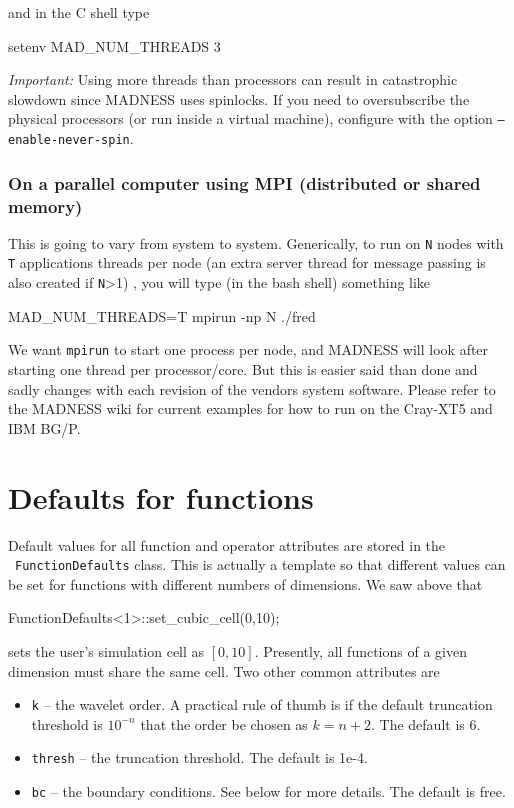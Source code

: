 \documentclass[letterpaper]{article}
\newcommand\liststyleLiv{%
\renewcommand\labelitemi{{\textbullet}}
\renewcommand\labelitemii{${\circ}$}
\renewcommand\labelitemiii{${\blacksquare}$}
\renewcommand\labelitemiv{{\textbullet}}
}
\begin{document}
and in the C shell type

{\ttfamily
setenv MAD\_NUM\_THREADS 3}


\bigskip

\textit{Important: }Using more threads than processors can result in catastrophic slowdown since MADNESS uses spinlocks.
If you need to oversubscribe the physical processors (or run inside a virtual machine), configure with the option
\texttt{{}--enable-never-spin}.

\subsubsection{On a parallel computer using MPI (distributed or shared memory)}
This is going to vary from system to system. Generically, to run on \texttt{N} nodes with \texttt{T} applications
threads per node (an extra server thread for message passing is also created if \texttt{N}{\textgreater}1) , you will
type (in the bash shell) something like

{\ttfamily
MAD\_NUM\_THREADS=T mpirun -np N ./fred}


\bigskip

We want \texttt{mpirun} to start one process per node, and MADNESS will look after starting one thread per
processor/core. But this is easier said than done and sadly changes with each revision of the vendors system software.
Please refer to the MADNESS wiki for current examples for how to run on the Cray-XT5 and IBM BG/P.

\section{Defaults for functions}
Default values for all function and operator attributes are stored in the \ \texttt{FunctionDefaults} class. This is
actually a template so that different values can be set for functions with different numbers of dimensions. We saw
above that

{\ttfamily
FunctionDefaults{\textless}1{\textgreater}::set\_cubic\_cell(0,10);}

sets the user's simulation cell as  $[0,10]$. Presently, all functions of a given dimension must share the same cell.
Two other common attributes are

\liststyleLiv
\begin{itemize}
\item \texttt{k} -- the wavelet order. A practical rule of thumb is if the default truncation threshold is  $10^{-n}$
that the order be chosen as  $k=n+2$. The default is 6.
\item \texttt{thresh} -- the truncation threshold. The default is 1e-4.
\item \texttt{bc} -- the boundary conditions. See below for more details. The default is free.
\end{itemize}
\end{document}
